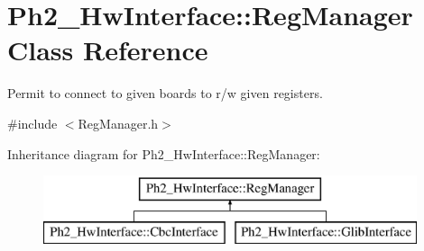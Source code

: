 \hypertarget{class_ph2___hw_interface_1_1_reg_manager}{\section{Ph2\-\_\-\-Hw\-Interface\-:\-:Reg\-Manager Class Reference}
\label{class_ph2___hw_interface_1_1_reg_manager}
}


Permit to connect to given boards to r/w given registers.  




{\ttfamily \#include $<$Reg\-Manager.\-h$>$}

Inheritance diagram for Ph2\-\_\-\-Hw\-Interface\-:\-:Reg\-Manager\-:\begin{figure}[H]
\begin{center}
\leavevmode
\includegraphics[height=2.000000cm]{class_ph2___hw_interface_1_1_reg_manager}
\end{center}
\end{figure}
